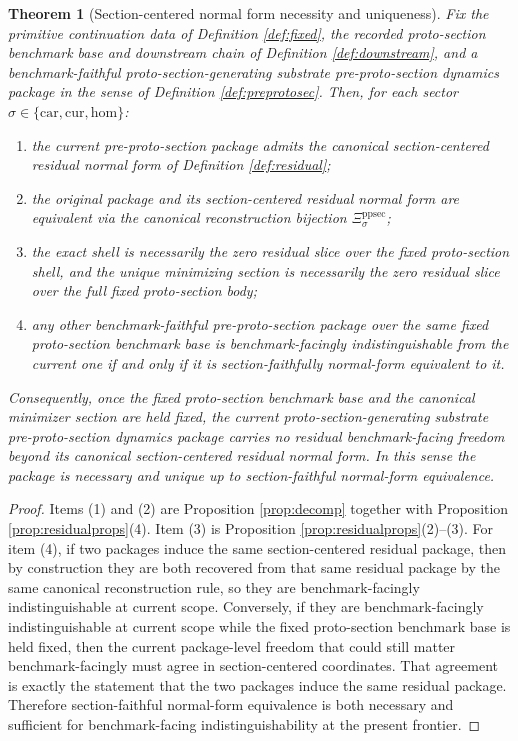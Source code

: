 \documentclass[11pt]{article}
\newcommand{\Car}{\mathrm{car}}
\newcommand{\Cur}{\mathrm{cur}}
\newcommand{\Hom}{\mathrm{hom}}
\newcommand{\PreProtoSectionNormalizer}[1]{\Xi_{#1}^{\mathrm{ppsec}}}
\newtheorem{theorem}{Theorem}
\begin{document}
\begin{theorem}[Section-centered normal form necessity and uniqueness]
\label{thm:main}
Fix the primitive continuation data of Definition \ref{def:fixed}, the recorded proto-section benchmark base and downstream chain of Definition \ref{def:downstream}, and a benchmark-faithful proto-section-generating substrate pre-proto-section dynamics package in the sense of Definition \ref{def:preprotosec}. Then, for each sector \(\sigma\in\{\Car,\Cur,\Hom\}\):
\begin{enumerate}
    \item the current pre-proto-section package admits the canonical section-centered residual normal form of Definition \ref{def:residual};
    \item the original package and its section-centered residual normal form are equivalent via the canonical reconstruction bijection \(\PreProtoSectionNormalizer{\sigma}\);
    \item the exact shell is necessarily the zero residual slice over the fixed proto-section shell, and the unique minimizing section is necessarily the zero residual slice over the full fixed proto-section body;
    \item any other benchmark-faithful pre-proto-section package over the same fixed proto-section benchmark base is benchmark-facingly indistinguishable from the current one if and only if it is section-faithfully normal-form equivalent to it.
\end{enumerate}
Consequently, once the fixed proto-section benchmark base and the canonical minimizer section are held fixed, the current proto-section-generating substrate pre-proto-section dynamics package carries no residual benchmark-facing freedom beyond its canonical section-centered residual normal form. In this sense the package is necessary and unique up to section-faithful normal-form equivalence.
\end{theorem}

\begin{proof}
Items (1) and (2) are Proposition \ref{prop:decomp} together with Proposition \ref{prop:residualprops}(4). Item (3) is Proposition \ref{prop:residualprops}(2)--(3). For item (4), if two packages induce the same section-centered residual package, then by construction they are both recovered from that same residual package by the same canonical reconstruction rule, so they are benchmark-facingly indistinguishable at current scope. Conversely, if they are benchmark-facingly indistinguishable at current scope while the fixed proto-section benchmark base is held fixed, then the current package-level freedom that could still matter benchmark-facingly must agree in section-centered coordinates. That agreement is exactly the statement that the two packages induce the same residual package. Therefore section-faithful normal-form equivalence is both necessary and sufficient for benchmark-facing indistinguishability at the present frontier.
\end{proof}
\end{document}
